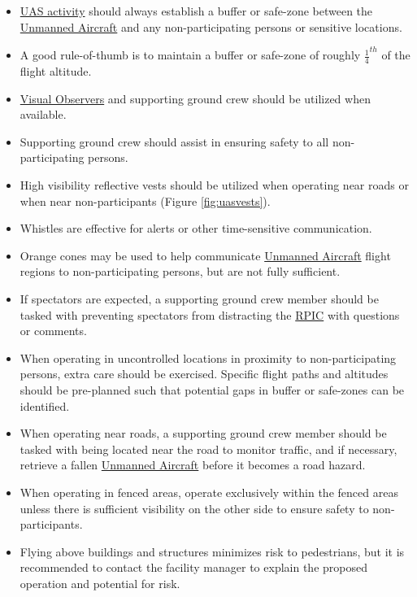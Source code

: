 \documentclass[
]{book}
\providecommand{\tightlist}{%
  \setlength{\itemsep}{0pt}\setlength{\parskip}{0pt}}
\begin{document}
\begin{itemize}
\tightlist
\item
  \protect\hyperlink{UASactivity}{UAS activity} should always establish a buffer or safe-zone between the \protect\hyperlink{UA}{Unmanned Aircraft} and any non-participating persons or sensitive locations.\\
\item
  A good rule-of-thumb is to maintain a buffer or safe-zone of roughly \({\frac{1}{4}}^{th}\) of the flight altitude.\\
\item
  \protect\hyperlink{VO}{Visual Observers} and supporting ground crew should be utilized when available.
\item
  Supporting ground crew should assist in ensuring safety to all non-participating persons.
\item
  High visibility reflective vests should be utilized when operating near roads or when near non-participants (Figure \ref{fig:uasvests}).
\item
  Whistles are effective for alerts or other time-sensitive communication.
\item
  Orange cones may be used to help communicate \protect\hyperlink{UA}{Unmanned Aircraft} flight regions to non-participating persons, but are not fully sufficient.
\item
  If spectators are expected, a supporting ground crew member should be tasked with preventing spectators from distracting the \protect\hyperlink{RPIC}{RPIC} with questions or comments.
\item
  When operating in uncontrolled locations in proximity to non-participating persons, extra care should be exercised. Specific flight paths and altitudes should be pre-planned such that potential gaps in buffer or safe-zones can be identified.
\item
  When operating near roads, a supporting ground crew member should be tasked with being located near the road to monitor traffic, and if necessary, retrieve a fallen \protect\hyperlink{UA}{Unmanned Aircraft} before it becomes a road hazard.
\item
  When operating in fenced areas, operate exclusively within the fenced areas unless there is sufficient visibility on the other side to ensure safety to non-participants.
\item
  Flying above buildings and structures minimizes risk to pedestrians, but it is recommended to contact the facility manager to explain the proposed operation and potential for risk.
\end{itemize}
\end{document}
